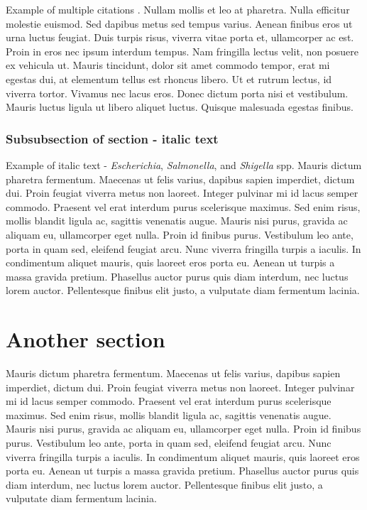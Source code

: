 Example of multiple citations \citep{altschul1997gapped,baker2007novel}. Nullam mollis et leo at pharetra. Nulla efficitur molestie euismod. Sed dapibus metus sed tempus varius. Aenean finibus eros ut urna luctus feugiat. Duis turpis risus, viverra vitae porta et, ullamcorper ac est. Proin in eros nec ipsum interdum tempus. Nam fringilla lectus velit, non posuere ex vehicula ut. Mauris tincidunt, dolor sit amet commodo tempor, erat mi egestas dui, at elementum tellus est rhoncus libero. Ut et rutrum lectus, id viverra tortor. Vivamus nec lacus eros. Donec dictum porta nisi et vestibulum. Mauris luctus ligula ut libero aliquet luctus. Quisque malesuada egestas finibus. 
\subsubsection{Subsubsection of section - italic text}
Example of italic text - {\it Escherichia}, {\it Salmonella}, and {\it Shigella} spp. Mauris dictum pharetra fermentum. Maecenas ut felis varius, dapibus sapien imperdiet, dictum dui. Proin feugiat viverra metus non laoreet. Integer pulvinar mi id lacus semper commodo. Praesent vel erat interdum purus scelerisque maximus. Sed enim risus, mollis blandit ligula ac, sagittis venenatis augue. Mauris nisi purus, gravida ac aliquam eu, ullamcorper eget nulla. Proin id finibus purus. Vestibulum leo ante, porta in quam sed, eleifend feugiat arcu. Nunc viverra fringilla turpis a iaculis. In condimentum aliquet mauris, quis laoreet eros porta eu. Aenean ut turpis a massa gravida pretium. Phasellus auctor purus quis diam interdum, nec luctus lorem auctor. Pellentesque finibus elit justo, a vulputate diam fermentum lacinia. 
\section{Another section}
Mauris dictum pharetra fermentum. Maecenas ut felis varius, dapibus sapien imperdiet, dictum dui. Proin feugiat viverra metus non laoreet. Integer pulvinar mi id lacus semper commodo. Praesent vel erat interdum purus scelerisque maximus. Sed enim risus, mollis blandit ligula ac, sagittis venenatis augue. Mauris nisi purus, gravida ac aliquam eu, ullamcorper eget nulla. Proin id finibus purus. Vestibulum leo ante, porta in quam sed, eleifend feugiat arcu. Nunc viverra fringilla turpis a iaculis. In condimentum aliquet mauris, quis laoreet eros porta eu. Aenean ut turpis a massa gravida pretium. Phasellus auctor purus quis diam interdum, nec luctus lorem auctor. Pellentesque finibus elit justo, a vulputate diam fermentum lacinia. 

